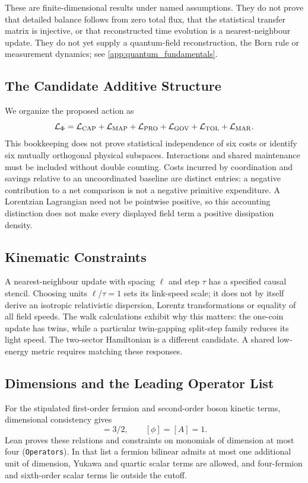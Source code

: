 These are finite-dimensional results under named assumptions. They do not prove that detailed balance follows from zero total flux, that the statistical transfer matrix is injective, or that reconstructed time evolution is a nearest-neighbour update. They do not yet supply a quantum-field reconstruction, the Born rule or measurement dynamics; see \cref{app:quantum_fundamentals}.

\subsection{The Candidate Additive Structure}
\label{subsec:additive_structure}
We organize the proposed action as
\begin{equation}
 \mathcal L_\Phi=\mathcal L_{\rm CAP}+\mathcal L_{\rm MAP}+\mathcal L_{\rm PRO}
 +\mathcal L_{\rm GOV}+\mathcal L_{\rm TOL}+\mathcal L_{\rm MAR}.
\end{equation}
This bookkeeping does not prove statistical independence of six costs or identify six mutually orthogonal physical subspaces. Interactions and shared maintenance must be included without double counting. Costs incurred by coordination and savings relative to an uncoordinated baseline are distinct entries: a negative contribution to a net comparison is not a negative primitive expenditure. A Lorentzian Lagrangian need not be pointwise positive, so this accounting distinction does not make every displayed field term a positive dissipation density.

\subsection{Kinematic Constraints}
\label{subsec:kinetic_constraint}
A nearest-neighbour update with spacing $\ell$ and step $\tau$ has a specified causal stencil. Choosing units $\ell/\tau=1$ sets its link-speed scale; it does not by itself derive an isotropic relativistic dispersion, Lorentz transformations or equality of all field speeds. The walk calculations exhibit why this matters: the one-coin update has twins, while a particular twin-gapping split-step family reduces its light speed. The two-sector Hamiltonian is a different candidate. A shared low-energy metric requires matching these responses.

\subsection{Dimensions and the Leading Operator List}
\label{subsec:mapping_rules}
\label{sec:equipartition}
For the stipulated first-order fermion and second-order boson kinetic terms, dimensional consistency gives
\begin{equation}
 [\psi]=3/2,\qquad [\phi]=[A]=1.
\end{equation}
Lean proves these relations and constraints on monomials of dimension at most four (\nolinkurl{Operators}). In that list a fermion bilinear admits at most one additional unit of dimension, Yukawa and quartic scalar terms are allowed, and four-fermion and sixth-order scalar terms lie outside the cutoff.

